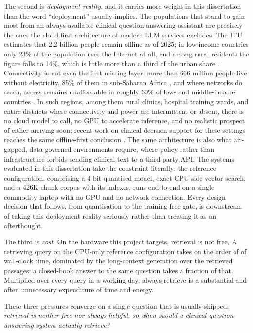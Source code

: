 The second is \emph{deployment reality}, and it carries more weight in this
dissertation than the word ``deployment'' usually implies. The populations
that stand to gain most from an always-available clinical question-answering
assistant are precisely the ones the cloud-first architecture of modern LLM
services excludes. The ITU estimates that 2.2 billion people remain offline
as of 2025; in low-income countries only 23\% of the population uses the
Internet at all, and among rural residents the figure falls to 14\%, which is
little more than a third of the urban share
\citep{itu2025factsfigures}. Connectivity is not even the first missing
layer: more than 666 million people live without electricity, 85\% of them
in sub-Saharan Africa \citep{sdg7tracking2025}, and where networks do reach,
access remains unaffordable in roughly 60\% of low- and middle-income
countries \citep{itu2025factsfigures}. In such regions, among them rural
clinics, hospital training wards, and entire districts where connectivity and
power are intermittent or absent, there is no cloud model to call, no GPU to
accelerate inference, and no realistic prospect of either arriving soon;
recent work on clinical decision support for these settings reaches the
same offline-first conclusion \citep{walusimbi2026aletheia}. The same
architecture is also what air-gapped, data-governed environments require,
where policy rather than infrastructure forbids sending clinical text to a
third-party API. The systems evaluated in this dissertation take the
constraint literally: the reference configuration, comprising a 4-bit
quantised model, exact CPU-side vector search, and a 426K-chunk corpus with
its indexes, runs end-to-end on a single commodity laptop with no GPU and no
network connection. Every design decision that follows, from quantisation
to the training-free gate, is downstream of taking this deployment reality
seriously rather than treating it as an afterthought.

The third is \emph{cost}. On the hardware this project targets, retrieval is
not free. A retrieving query on the CPU-only reference configuration takes on
the order of \latPoneMcq{} of wall-clock time, dominated by the long-context
generation over the retrieved passages; a closed-book answer to the same
question takes a fraction of that. Multiplied over every query in a working
day, always-retrieve is a substantial and often unnecessary expenditure of
time and energy.

These three pressures converge on a single question that is usually skipped:
\emph{retrieval is neither free nor always helpful, so when should a
clinical question-answering system actually retrieve?}

